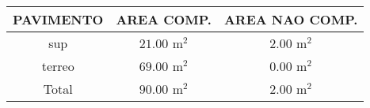\documentclass[10pt]{article}
\begin{document}
\begin{tabular}{ccc}
\hline
PAVIMENTO & AREA COMP. & AREA NAO COMP. \\
\hline
sup & $21.00$ m$^2$ & $2.00$ m$^2$ \\
terreo & $69.00$ m$^2$ & $0.00$ m$^2$ \\
Total & $90.00$ m$^2$ & $2.00$ m$^2$ \\
\hline
\end{tabular}
\end{document}
